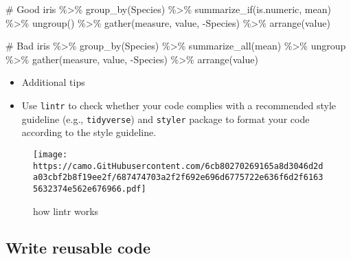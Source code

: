 \documentclass[
  letterpaper,
  DIV=11,
  numbers=noendperiod]{scrreprt}
\newenvironment{Shaded}{\begin{snugshade}}{\end{snugshade}}
\newcommand{\CommentTok}[1]{\textcolor[rgb]{0.37,0.37,0.37}{#1}}
\newcommand{\FunctionTok}[1]{\textcolor[rgb]{0.28,0.35,0.67}{#1}}
\newcommand{\NormalTok}[1]{\textcolor[rgb]{0.00,0.23,0.31}{#1}}
\newcommand{\SpecialCharTok}[1]{\textcolor[rgb]{0.37,0.37,0.37}{#1}}
\begin{document}
\begin{Shaded}
\begin{Highlighting}[]
\CommentTok{\# Good}
\NormalTok{iris }\SpecialCharTok{\%\textgreater{}\%}
  \FunctionTok{group\_by}\NormalTok{(Species) }\SpecialCharTok{\%\textgreater{}\%}
  \FunctionTok{summarize\_if}\NormalTok{(is.numeric, mean) }\SpecialCharTok{\%\textgreater{}\%}
  \FunctionTok{ungroup}\NormalTok{() }\SpecialCharTok{\%\textgreater{}\%}
  \FunctionTok{gather}\NormalTok{(measure, value, }\SpecialCharTok{{-}}\NormalTok{Species) }\SpecialCharTok{\%\textgreater{}\%}
  \FunctionTok{arrange}\NormalTok{(value)}

\CommentTok{\# Bad}
\NormalTok{iris }\SpecialCharTok{\%\textgreater{}\%} \FunctionTok{group\_by}\NormalTok{(Species) }\SpecialCharTok{\%\textgreater{}\%} \FunctionTok{summarize\_all}\NormalTok{(mean) }\SpecialCharTok{\%\textgreater{}\%}
\NormalTok{ungroup }\SpecialCharTok{\%\textgreater{}\%} \FunctionTok{gather}\NormalTok{(measure, value, }\SpecialCharTok{{-}}\NormalTok{Species) }\SpecialCharTok{\%\textgreater{}\%}
\FunctionTok{arrange}\NormalTok{(value)}
\end{Highlighting}
\end{Shaded}

\begin{itemize}
\item
  Additional tips
\item
  Use \texttt{lintr} to check whether your code complies with a
  recommended style guideline (e.g., \texttt{tidyverse}) and
  \texttt{styler} package to format your code according to the style
  guideline.
\end{itemize}

\begin{figure}

{\centering \texttt{[image: https://camo.GitHubusercontent.com/6cb80270269165a8d3046d2da03cbf2b8f19ee2f/687474703a2f2f692e696d6775722e636f6d2f61635632374e562e676966.pdf]}

}

\caption{how lintr works}

\end{figure}

\hypertarget{write-reusable-code}{%
\subsection*{Write reusable code}\label{write-reusable-code}}
\end{document}
